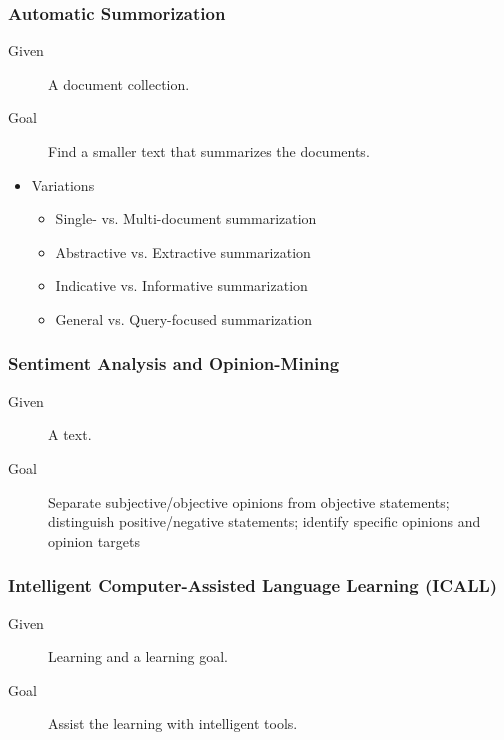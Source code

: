             \subsubsection{Automatic Summorization} %
	            \begin{description}
	            	\item[Given] A document collection.
	            	\item[Goal] Find a smaller text that summarizes the documents.
	            \end{description}
            	\begin{itemize}
            		\item Variations
            			\begin{itemize}
            				\item Single- vs. Multi-document summarization
            				\item Abstractive vs. Extractive summarization
            				\item Indicative vs. Informative summarization
            				\item General vs. Query-focused summarization
            			\end{itemize}
            	\end{itemize}
            
            \subsubsection{Sentiment Analysis and Opinion-Mining} %
	            \begin{description}
	            	\item[Given] A text.
	            	\item[Goal] Separate subjective/objective opinions from objective statements; distinguish positive/negative statements; identify specific opinions and opinion targets
	            \end{description}
            
            \subsubsection{Intelligent Computer-Assisted Language Learning (ICALL)} %
	            \begin{description}
	            	\item[Given] Learning and a learning goal.
	            	\item[Goal] Assist the learning with intelligent tools.
	            \end{description}

